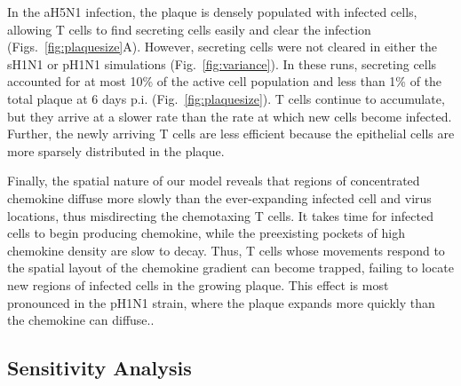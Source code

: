 \documentclass[10pt]{article}
\begin{document}

In the aH5N1 infection, the plaque is densely populated with infected cells, allowing T cells to find secreting cells easily and clear the infection (Figs.~\ref{fig:plaquesize}A).  However, secreting cells were not cleared in either the sH1N1 or pH1N1 simulations (Fig.~\ref{fig:variance}).  In these runs, secreting cells accounted for at most 10\% of the active cell population and less than 1\% of the total plaque at 6 days p.i. (Fig.~\ref{fig:plaquesize}).  T cells continue to accumulate, but they arrive at a slower rate than the rate at which new cells become infected.  Further, the newly arriving T cells are less efficient because the epithelial cells are more sparsely distributed in the plaque.

Finally, the spatial nature of our model reveals that regions of concentrated chemokine diffuse more slowly than the ever-expanding infected cell and virus locations, thus misdirecting the chemotaxing T cells.  It takes time for infected cells to begin producing chemokine, while the preexisting pockets of high chemokine density are slow to decay.  Thus, T cells whose movements respond to the spatial layout of the chemokine gradient can become trapped, failing to locate new regions of infected cells in the growing plaque.  This effect is most pronounced in the pH1N1 strain, where the plaque expands more quickly than the chemokine can diffuse..



\subsection*{Sensitivity Analysis}

\end{document}
